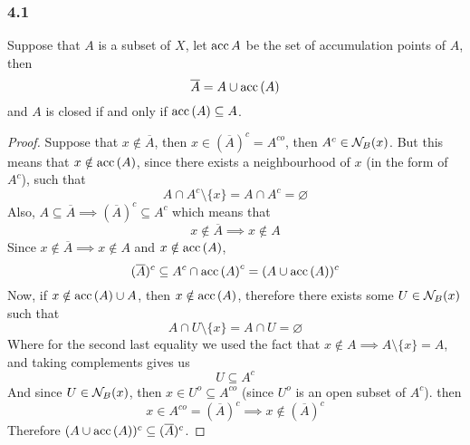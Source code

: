 \documentclass[../../main.tex]{subfiles}
\begin{document}
\subsubsection*{4.1}
\begin{wts}
Suppose that $A$ is a subset of $X$, let $\operatorname{acc}{A}$ be the set of accumulation points of $A$, then
\begin{equation}
    \overline{A}=A\cup\operatorname{acc}{(A)}
\end{equation}
and $A$ is closed if and only if $\operatorname{acc}{(A)}\subseteq A$.
\end{wts}
\begin{proof}
Suppose that $x\notin \overline{A}$, then $x\in (\overline{A})^c=A^{co}$, then $A^c\in\mathcal{N}_B({x})$. But this means that $x\notin\operatorname{acc}{(A)}$, since there exists a neighbourhood of $x$ (in the form of $A^c$), such that 
\[
A\cap A^c\setminus\{x\}=A\cap A^c=\varnothing
\]
Also, $A\subseteq \overline{A}\implies (\overline{A})^c\subseteq A^c$ which means that
\[
x\notin \overline{A}\implies x\notin A
\]
Since $x\notin \overline{A}\implies x\notin A$ and $x\notin \operatorname{acc}{(A)}$,
\[
(\overline{A})^c\subseteq A^c\cap \operatorname{acc}{(A)}^c = (A\cup \operatorname{acc}{(A)})^c
\]
Now, if $x\notin \operatorname{acc}{(A)}\cup A$, then $x\notin\operatorname{acc}{(A)}$, therefore there exists some $U\in\mathcal{N}_B({x})$ such that 
\[
A\cap U\setminus\{x\} = A\cap U=\varnothing
\]
Where for the second last equality we used the fact that $x\notin A\implies A\setminus\{x\}=A$, and taking complements gives us
\[
U\subseteq A^c
\]
And since $U\in\mathcal{N}_B({x})$, then $x\in U^o\subseteq A^{co}$ (since $U^o$ is an open subset of $A^c$). then
\[
x\in A^{co} = (\overline{A})^c\implies x\notin (\overline{A})^c
\]
Therefore $(A\cup\operatorname{acc}{(A)})^c\subseteq (\overline{A})^c$.
\end{proof}
\end{document}
